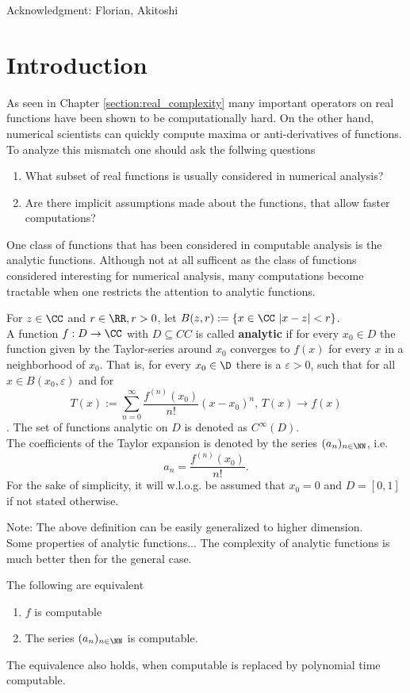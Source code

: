 	Acknowledgment: Florian, Akitoshi
	\section{Introduction}
		As seen in Chapter \ref{section:real_complexity} many important operators 
		on real functions have been shown to be computationally hard.
		On the other hand, numerical scientists can quickly compute maxima or anti-derivatives of functions.
		To analyze this mismatch one should ask the follwing questions
		\begin{enumerate}
			\item What subset of real functions is usually considered in numerical analysis?
			\item Are there implicit assumptions made about the functions, that allow faster computations? 
		\end{enumerate}
		One class of functions that has been considered in computable analysis is the analytic functions.
		Although not at all sufficent as the class of functions considered interesting for numerical analysis, 
		many computations become tractable when one restricts the attention to analytic functions.
		\begin{definition}
			For $z \in \CC$ and $r \in \RR, r > 0$, let $B(z,r) := \{ x \in \CC \,\, | x - z | < r\}$. \\
			A function $f: D \to \CC$ with $D \subseteq CC$ is called \textbf{analytic} if for every $x_0 \in D$ 
			the function given by the Taylor-series around $x_0$ converges to $f(x)$ for every $x$ in a neighborhood of 
			$x_0$. 
			That is, for every $x_0 \in \D$ there is a $\varepsilon > 0$, such that for all $x \in B(x_0, \varepsilon)$ and for 
			$$ T(x) := \sum_{n=0}^{\infty} \frac{f^{(n)}(x_0)}{n!}(x-x_0)^n  \text{, } T(x) \rightarrow f(x)$$.
			The set of functions analytic on $D$ is denoted as $C^\infty(D)$. \\
			The coefficients of the Taylor expansion is denoted by the series $(a_n)_{n \in \NN}$, i.e. 
			$$ a_n = \frac{f^{(n)}(x_0)}{n!}. $$    
			For the sake of simplicity, it will w.l.o.g. be assumed that $x_0 = 0$  and $D = [0,1]$ if not stated otherwise.
		\end{definition}
		Note: The above definition can be easily generalized to higher dimension. \\
		Some properties of analytic functions...
		The complexity of analytic functions is much better then for the general case.
		\begin{theorem} 
			The following are equivalent
			\begin{enumerate}
				\item $f$ is computable 
				\item The series $(a_n)_{n \in \NN}$ is computable. 
 			\end{enumerate}
 			The equivalence also holds, when computable is replaced by polynomial time computable.
		\end{theorem}
